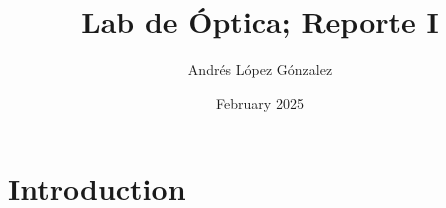 \documentclass{article}
\title{Lab de Óptica; Reporte I}
\author{Andrés López Gónzalez}
\date{February 2025}
\begin{document}
\maketitle

\section{Introduction}
\end{document}
